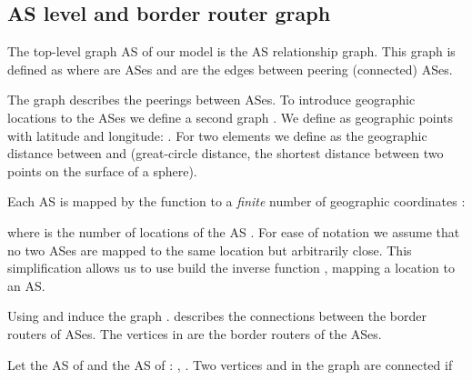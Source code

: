 \documentclass{sig-alternate-10pt}
\begin{document}
\subsection{AS level and border router graph}
\label{sec:two-graphs}

The top-level graph AS   of our model is the AS relationship graph.  This graph is defined as  where  are ASes and  are the edges between peering (connected) ASes. 

The graph  describes the peerings between ASes. To introduce geographic locations to the ASes we define a second graph . We define  as geographic points with latitude and longitude: . For two elements  we define  as the geographic distance between  and  (great-circle distance, the shortest distance between two points on the surface of a sphere).

Each AS  is mapped by the function  to a \emph{finite} number of geographic coordinates :  


\noindent where  is the number of locations of the AS . For ease of notation we assume that no two ASes are mapped to the same location but arbitrarily close. This simplification allows us to use build the inverse function , mapping a location to an AS. 

Using  and  induce the graph .  describes the connections between the border routers of ASes. The vertices in  are the border routers of the ASes. 

Let  the AS of  and  the AS of : , . Two vertices  and  in the graph  are connected if
\end{document}
